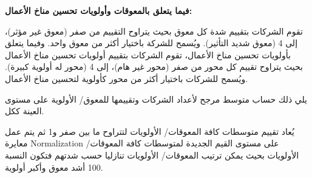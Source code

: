 \vspace{1.5em}

\noindent
{\fontsize{12}{15}\selectfont \textbf{\color{ecestitle} فيما يتعلق بالمعوقات وأولويات تحسين مناخ الأعمال:}}

\vspace{0.8em}

\noindent
{\fontsize{11}{15}\selectfont \color{textdark}
تقوم الشركات بتقييم شدة كل معوق بحيث يتراوح التقييم من صفر (معوق غير مؤثر)، إلى 4 (معوق شديد التأثير). ويُسمح للشركة باختيار أكثر من معوق واحد. وفيما يتعلق بأولويات تحسين مناخ الأعمال، تقوم الشركات بتقييم أولويات تحسين مناخ الأعمال بحيث يتراوح تقييم كل محور من صفر (محور غير هام)، إلى 4 (محور له أولوية كبيرة). ويُسمح للشركات باختيار أكثر من محور كأولوية لتحسين مناخ الأعمال.

\vspace{0.8em}

يلي ذلك حساب متوسط مرجح لأعداد الشركات وتقييمها للمعوق/ الأولوية على مستوى العينة ككل.

\vspace{0.8em}

يُعاد تقييم متوسطات كافة المعوقات/ الأولويات لتتراوح ما بين صفر و1 ثم يتم عمل معايرة Normalization على مستوى القيم الجديدة لمتوسطات كافة المعوقات/ الأولويات بحيث يمكن ترتيب المعوقات/ الأولويات تنازليا حسب شدتهم فتكون النسبة 100 أشد معوق وأكبر أولوية.
}

\clearpage